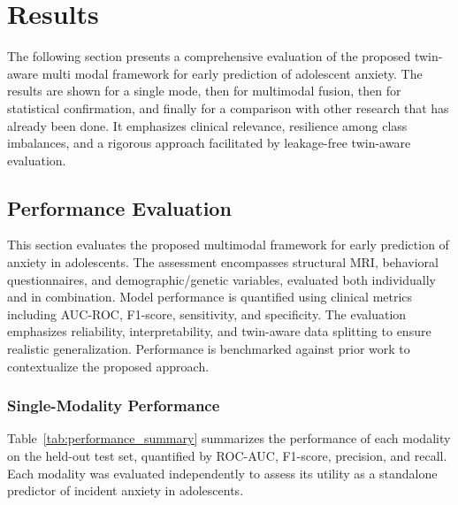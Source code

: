 \documentclass[10pt,letterpaper]{article}
\begin{document}
\section*{Results}
                                                                                                                          The following section presents a comprehensive evaluation of the proposed twin-aware multi modal framework for early prediction of adolescent anxiety. The results are shown for a single mode, then for multimodal fusion, then for statistical confirmation, and finally for a comparison with other research that has already been done. It emphasizes clinical relevance, resilience among class imbalances, and a rigorous approach facilitated by leakage-free twin-aware evaluation. 

                                                                                                                          \subsection*{Performance Evaluation}
                                                                                                                          This section evaluates the proposed multimodal framework for early prediction of anxiety in adolescents. The assessment encompasses structural MRI, behavioral questionnaires, and demographic/genetic variables, evaluated both individually and in combination. Model performance is quantified using clinical metrics including AUC-ROC, F1-score, sensitivity, and specificity. The evaluation emphasizes reliability, interpretability, and twin-aware data splitting to ensure realistic generalization. Performance is benchmarked against prior work to contextualize the proposed approach.

                                                                                                                          \subsubsection*{Single-Modality Performance}
                                                                                                                          Table~\ref{tab:performance_summary} summarizes the performance of each modality on the held-out test set, quantified by ROC-AUC, F1-score, precision, and recall. Each modality was evaluated independently to assess its utility as a standalone predictor of incident anxiety in adolescents.
\end{document}
